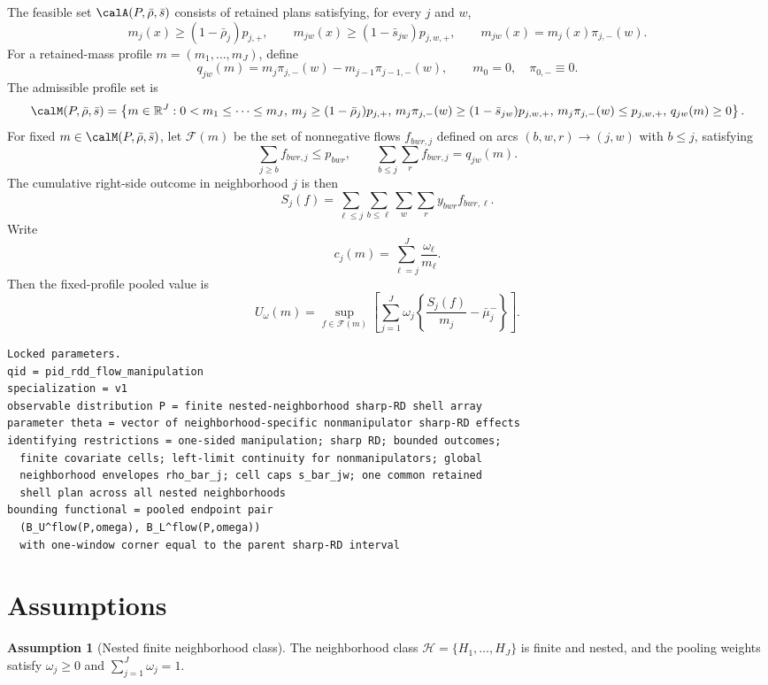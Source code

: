 \documentclass[11pt]{article}
\newcommand{\calH}{\mathcal{H}}
\newcommand{\calF}{\mathcal{F}}
\newcommand{\R}{\mathbb{R}}
\theoremstyle{definition}
\newtheorem{assumption}{Assumption}
\theoremstyle{plain}
\theoremstyle{remark}
\begin{document}
The feasible set \(\calA(P,\bar\rho,\bar s)\) consists of retained plans satisfying, for every \(j\) and
\(w\),
\[
  m_j(x)\ge (1-\bar\rho_j)p_{j,+},
  \qquad
  m_{jw}(x)\ge (1-\bar s_{jw})p_{j,w,+},
  \qquad
  m_{jw}(x)=m_j(x)\pi_{j,-}(w).
\]
For a retained-mass profile \(m=(m_1,\ldots,m_J)\), define
\[
  q_{jw}(m)=m_j\pi_{j,-}(w)-m_{j-1}\pi_{j-1,-}(w),
  \qquad m_0=0,\quad \pi_{0,-}\equiv 0.
\]
The admissible profile set is
\[
  \calM(P,\bar\rho,\bar s)=
  \left\{
  m\in\R^J:
  0<m_1\le\cdots\le m_J,\,
  m_j\ge (1-\bar\rho_j)p_{j,+},\,
  m_j\pi_{j,-}(w)\ge (1-\bar s_{jw})p_{j,w,+},\,
  m_j\pi_{j,-}(w)\le p_{j,w,+},\,
  q_{jw}(m)\ge0
  \right\}.
\]
For fixed \(m\in\calM(P,\bar\rho,\bar s)\), let \(\calF(m)\) be the set of nonnegative flows
\(f_{bwr,j}\) defined on arcs \((b,w,r)\to(j,w)\) with \(b\le j\), satisfying
\[
  \sum_{j\ge b} f_{bwr,j}\le p_{bwr},
  \qquad
  \sum_{b\le j}\sum_r f_{bwr,j}=q_{jw}(m).
\]
The cumulative right-side outcome in neighborhood \(j\) is then
\[
  S_j(f)=\sum_{\ell\le j}\sum_{b\le \ell}\sum_w\sum_r y_{bwr}f_{bwr,\ell}.
\]
Write
\[
  c_j(m)=\sum_{\ell=j}^J \frac{\omega_\ell}{m_\ell}.
\]
Then the fixed-profile pooled value is
\[
  U_\omega(m)=
  \sup_{f\in\calF(m)}
  \left[
  \sum_{j=1}^J \omega_j\!\left\{\frac{S_j(f)}{m_j}-\bar\mu^-_j\right\}
  \right].
\]

\begin{verbatim}
Locked parameters.
qid = pid_rdd_flow_manipulation
specialization = v1
observable distribution P = finite nested-neighborhood sharp-RD shell array
parameter theta = vector of neighborhood-specific nonmanipulator sharp-RD effects
identifying restrictions = one-sided manipulation; sharp RD; bounded outcomes;
  finite covariate cells; left-limit continuity for nonmanipulators; global
  neighborhood envelopes rho_bar_j; cell caps s_bar_jw; one common retained
  shell plan across all nested neighborhoods
bounding functional = pooled endpoint pair
  (B_U^flow(P,omega), B_L^flow(P,omega))
  with one-window corner equal to the parent sharp-RD interval
\end{verbatim}

\section{Assumptions}
\begin{assumption}[Nested finite neighborhood class]\label{ass:nested-class}
The neighborhood class \(\calH=\{H_1,\ldots,H_J\}\) is finite and nested, and the pooling weights satisfy
\(\omega_j\ge0\) and \(\sum_{j=1}^J \omega_j=1\).
\end{assumption}
\end{document}

